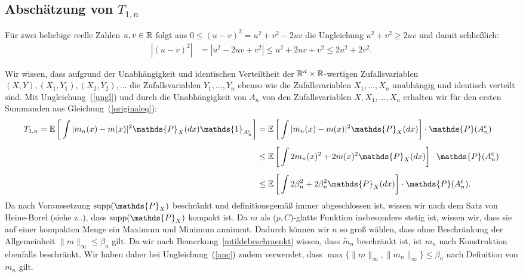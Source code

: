 \subsection{Abschätzung von $T_{1,n}$}

Für zwei beliebige reelle Zahlen $u, v \in \mathbb{R}$ folgt aus $0 \leq (u - v)^2 = u^2 + v^2 - 2uv$ die Ungleichung $u^2 + v^2 \geq 2uv$ und damit schließlich:
\begin{equation}
\label{ungl}
\begin{split}
|(u - v)^2| & = |u^2 - 2uv + v^2|
\leq  u^2 + 2uv + v^2
\leq 2u^2 + 2v^2.
\end{split}
\end{equation}

Wir wissen, dass aufgrund der Unabhängigkeit und identischen Verteiltheit der $\mathbb{R}^d \times \mathbb{R}$-wertigen Zufallsvariablen  $(X, Y), (X_1, Y_1), (X_2, Y_2), \dots$ die Zufallsvariablen $Y_1,\dots,Y_n$ ebenso wie die Zufallsvariablen $X_1,\dots,X_n$ unabhängig und identisch verteilt sind. 
Mit Ungleichung~(\ref{ungl}) und durch die Unabhängigkeit von $A_n$ von den Zufallsvariablen $X, X_1, \dots, X_n$ erhalten wir für den ersten Summanden aus Gleichung~(\ref{originaleq}):
\begin{equation}
\label{anc}
\begin{split}
 T_{1,n} = \E \bigg[\int |m_n(x) - m(x)|^2 \mathds{P}_X(dx) \mathds{1}_{A_n^{\mathsf{c}}}\bigg] & =  \E \bigg[\int |m_n(x) - m(x)|^2 \mathds{P}_X(dx) \bigg] \cdot \mathds{P}(A_n^{\mathsf{c}}) \\[0.5em]
 & \leq \E \bigg[\int 2m_n(x)^2 + 2m(x)^2 \mathds{P}_X(dx)\bigg] \cdot \mathds{P}(A_n^{\mathsf{c}})\\[0.5em]
 & \leq \E \bigg[\int  2\beta_n^2 + 2\beta_n^2 \mathds{P}_X(dx)\bigg] \cdot \mathds{P}(A_n^{\mathsf{c}}).
\end{split}
\end{equation}
Da nach Voraussetzung $\supp(\mathds{P}_X)$ beschränkt und definitionsgemäß immer abgeschlossen ist, wissen wir nach dem Satz von Heine-Borel (siehe z.\@B.\@ \cite[Satz 5]{forster2016}), dass $\supp(\mathds{P}_X)$ kompakt ist. Da $m$ als ($p,C$)-glatte Funktion insbesondere stetig ist, wissen wir, dass sie auf einer kompakten Menge ein Maximum und Minimum annimmt. Dadurch können wir $n$ so groß wählen, dass ohne Beschränkung der Allgemeinheit $\|m\|_{\infty} \leq \beta_n$ gilt.
Da wir nach Bemerkung~\ref{mtildebeschraenkt} wissen, dass $\tilde{m}_n$ beschränkt ist, ist $m_n$ nach Konstruktion ebenfalls beschränkt. Wir haben daher bei Ungleichung~(\ref{anc}) zudem verwendet, dass $\max\{\|m\|_{\infty}, \|m_n\|_{\infty}\} \leq \beta_n$ nach Definition von $m_n$ gilt. 

